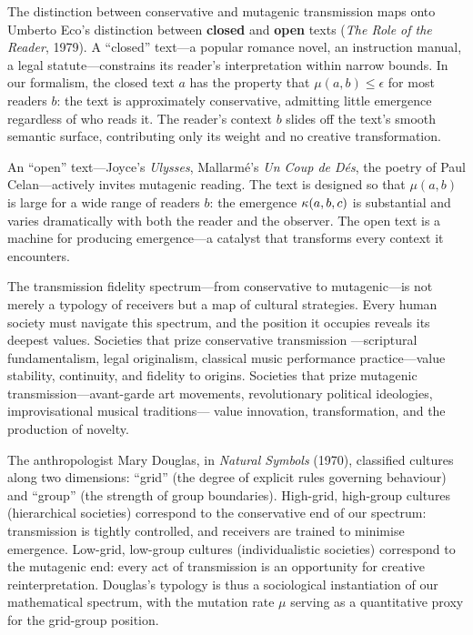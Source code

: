\begin{interpretation}
\label{interp:ch9:eco_open_closed}
The distinction between conservative and mutagenic transmission maps onto
Umberto Eco's distinction between \textbf{closed} and \textbf{open} texts
(\emph{The Role of the Reader}, 1979).  A ``closed'' text---a popular romance
novel, an instruction manual, a legal statute---constrains its reader's
interpretation within narrow bounds.  In our formalism, the closed text $a$
has the property that $\mu(a, b) \leq \epsilon$ for most readers $b$: the
text is approximately conservative, admitting little emergence regardless of
who reads it.  The reader's context $b$ slides off the text's smooth semantic
surface, contributing only its weight and no creative transformation.

An ``open'' text---Joyce's \emph{Ulysses}, Mallarm\'e's \emph{Un Coup de
D\'es}, the poetry of Paul Celan---actively invites mutagenic reading.
The text is designed so that $\mu(a, b)$ is large for a wide range of
readers $b$: the emergence $\kappa(a, b, c)$ is substantial and varies
dramatically with both the reader and the observer.  The open text is a
machine for producing emergence---a catalyst that transforms every context
it encounters.


\begin{interpretation}
\label{interp:ch9:spectrum_anthropology}
The transmission fidelity spectrum---from conservative to mutagenic---is not
merely a typology of receivers but a map of cultural strategies.  Every
human society must navigate this spectrum, and the position it occupies
reveals its deepest values.  Societies that prize conservative transmission
---scriptural fundamentalism, legal originalism, classical music
performance practice---value stability, continuity, and fidelity to origins.
Societies that prize mutagenic transmission---avant-garde art movements,
revolutionary political ideologies, improvisational musical traditions---
value innovation, transformation, and the production of novelty.

The anthropologist Mary Douglas, in \emph{Natural Symbols} (1970),
classified cultures along two dimensions: ``grid'' (the degree of
explicit rules governing behaviour) and ``group'' (the strength of group
boundaries).  High-grid, high-group cultures (hierarchical societies)
correspond to the conservative end of our spectrum: transmission is tightly
controlled, and receivers are trained to minimise emergence.  Low-grid,
low-group cultures (individualistic societies) correspond to the mutagenic
end: every act of transmission is an opportunity for creative
reinterpretation.  Douglas's typology is thus a sociological instantiation
of our mathematical spectrum, with the mutation rate $\mu$ serving as a
quantitative proxy for the grid-group position.
\end{interpretation}



\end{interpretation}
